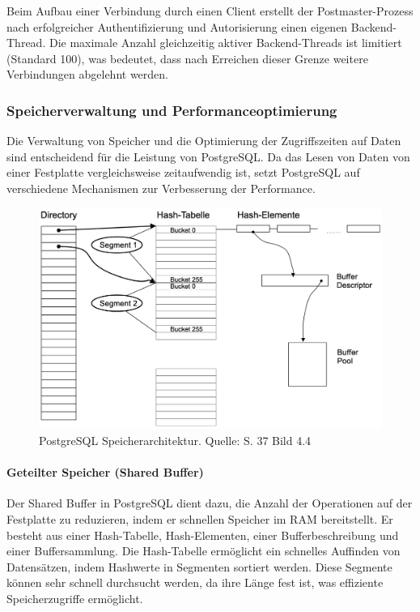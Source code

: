 Beim Aufbau einer Verbindung durch einen Client erstellt der Postmaster-Prozess nach erfolgreicher Authentifizierung und Autorisierung einen eigenen Backend-Thread. Die maximale Anzahl gleichzeitig aktiver Backend-Threads ist limitiert (Standard 100), was bedeutet, dass nach Erreichen dieser Grenze weitere Verbindungen abgelehnt werden.

\subsubsection{Speicherverwaltung und Performanceoptimierung}
Die Verwaltung von Speicher und die Optimierung der Zugriffszeiten auf Daten sind entscheidend für die Leistung von PostgreSQL. Da das Lesen von Daten von einer Festplatte vergleichsweise zeitaufwendig ist, setzt PostgreSQL auf verschiedene Mechanismen zur Verbesserung der Performance.

\begin{figure}[h]
\centering
\includegraphics[width=\textwidth]{img/PostgreSQL Speciheraufbau.png}
\caption{PostgreSQL Speicherarchitektur. Quelle:  \cite{Froehlich2022} S. 37 Bild 4.4}
\label{fig:Speicheraufbau}
\end{figure}

\paragraph{Geteilter Speicher (Shared Buffer)}
Der Shared Buffer in PostgreSQL dient dazu, die Anzahl der Operationen auf der Festplatte zu reduzieren, indem er schnellen Speicher im RAM bereitstellt. Er besteht aus einer Hash-Tabelle, Hash-Elementen, einer Bufferbeschreibung und einer Buffersammlung. Die Hash-Tabelle ermöglicht ein schnelles Auffinden von Datensätzen, indem Hashwerte in Segmenten sortiert werden. Diese Segmente können sehr schnell durchsucht werden, da ihre Länge fest ist, was effiziente Speicherzugriffe ermöglicht.


